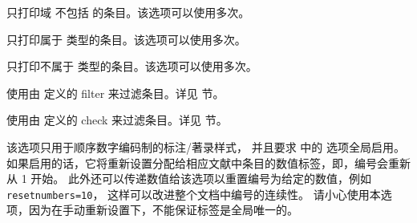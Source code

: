 \begin{optionlist*}


只打印域  不包括  的条目。该选项可以使用多次。



只打印属于  类型的条目。该选项可以使用多次。



只打印不属于  类型的条目。该选项可以使用多次。



使用由  定义的 filter  来过滤条目。详见  节。



使用由  定义的 check  来过滤条目。详见   节。



该选项只用于顺序数字编码制的标注/著录样式，
并且要求  中的  选项全局启用。
如果启用的话，它将重新设置分配给相应文献中条目的数值标签，即，编号会重新从 1 开始。
此外还可以传递数值给该选项以重置编号为给定的数值，例如 \texttt{resetnumbers=10}，
这样可以改进整个文档中编号的连续性。
请小心使用本选项，因为在手动重新设置下，\biblatex 不能保证标签是全局唯一的。


\end{optionlist*}
